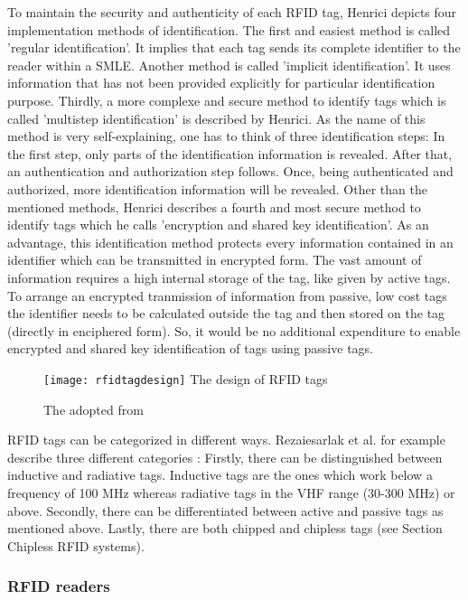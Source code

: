 To maintain the security and authenticity of each RFID tag, Henrici \cite[p.93 ff.]{henrici} depicts four implementation methods of identification. 
The first and easiest method is called 'regular identification'. It implies that each tag sends its complete identifier to the reader within a \ac{SMLE}. Another method is called 'implicit identification'. It uses information that has not been provided explicitly for particular identification purpose. Thirdly, a more complexe and secure method to identify tags which is called 'multistep identification' is described by Henrici. As the name of this method is very self-explaining, one has to think of three identification steps: In the first step, only parts of the identification information is revealed. After that, an authentication and authorization step follows. Once, being authenticated and authorized, more identification information will be revealed. 
Other than the mentioned methods, Henrici describes a fourth and most secure method to identify tags which he calls 'encryption and shared key identification'. As an advantage, this identification method protects every information contained in an identifier which can be transmitted in encrypted form. The vast amount of information requires a high internal storage of the tag, like given by active tags. To arrange an encrypted tranmission of information from passive, low cost tags the identifier needs to be calculated outside the tag and then stored on the tag (directly in enciphered form). So, it would be no additional expenditure to enable encrypted and shared key identification of tags using passive tags. 

\begin{figure}
\centering
\texttt{[image: rfidtagdesign]} The design of RFID tags 
\caption{\label{fig:tagdesign}The adopted from \cite[p.13]{chipless}} 
\end{figure}

RFID tags can be categorized in different ways. Rezaiesarlak et al. \cite{chipless} for example describe three different categories \cite[p.9 ff.]{chipless}: Firstly, there can be distinguished between inductive and radiative tags. Inductive tags are the ones which work below a frequency of 100 MHz whereas radiative tags in the \ac{VHF} range (30-300 MHz) or above. Secondly, there can be differentiated between active and passive tags as mentioned above. Lastly, there are both chipped and chipless tags (see Section Chipless RFID systems\pageref{chipless}). 

\subsubsection{RFID readers} \label{reader}

